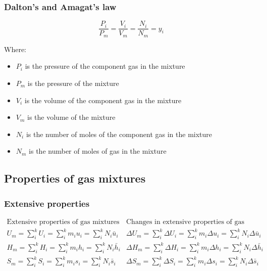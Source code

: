 \documentclass[11pt]{article}
\begin{document}
 \newpage
\subsubsection{Dalton's and Amagat's law}
\label{sec:org0568ed9}
\[\frac{P_i}{P_m} = \frac{V_i}{V_m} = \frac{N_i}{N_m} = y_i\]

Where:
\begin{itemize}
\item \(P_i\) is the pressure of the component gas in the mixture
\item \(P_m\) is the pressure of the mixture
\item \(V_i\) is the volume of the component gas in the mixture
\item \(V_m\) is the volume of the mixture
\item \(N_i\) is the number of moles of the component gas in the mixture
\item \(N_m\) is the number of moles of gas in the mixture
\end{itemize}
\subsection{Properties of gas mixtures}
\label{sec:org326ea5b}

\subsubsection{Extensive properties}
\label{sec:org413c75c}
\begin{displaymath}
\begin{array}{c|c}
\text{Extensive properties of gas mixtures} & \text{Changes in extensive properties of gas mixtures} \\
\hline
U_m = \sum_i^k U_i = \sum_i^k m_i u_i = \sum_i^k N_i \bar{u}_i &
\Delta U_m = \sum_i^k \Delta U_i = \sum_i^k m_i \Delta u_i = \sum_i^k N_i \Delta \bar{u}_i \\
H_m = \sum_i^k H_i = \sum_i^k m_i h_i = \sum_i^k N_i \bar{h}_i &
\Delta H_m = \sum_i^k \Delta H_i = \sum_i^k m_i \Delta h_i = \sum_i^k N_i \Delta \bar{h}_i \\
S_m = \sum_i^k S_i = \sum_i^k m_i s_i = \sum_i^k N_i \bar{s}_i &
\Delta S_m = \sum_i^k \Delta S_i = \sum_i^k m_i \Delta s_i = \sum_i^k N_i \Delta \bar{s}_i
\end{array}
\end{displaymath}
\end{document}
